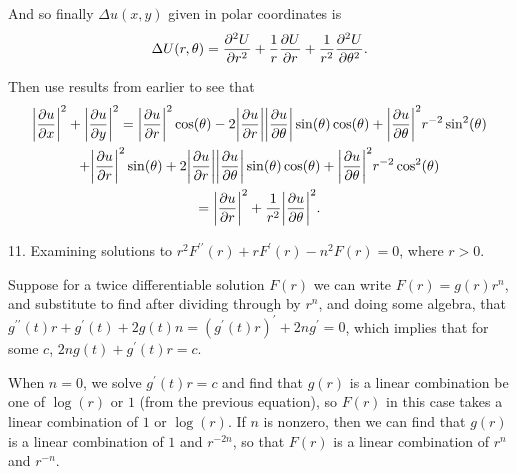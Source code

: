 \documentclass[11pt]{article}
\newcommand{\br}[1]{\left(#1\right)}
\begin{document}
And so finally $\Delta u(x,y)$ given in polar coordinates is \[\Delta U(r,\theta) = \pdv[2]{U}{r} + \frac{1}{r}\pdv{U}{r} + \frac{1}{r^2}\pdv[2]{U}{\theta}.\]

Then use results from earlier to see that \begin{multline*}\abs{\pdv{u}{x}}^2 + \abs{\pdv{u}{y}}^2 = \abs{\pdv{u}{r}}^2\cos(\theta) - 2\abs{\pdv{u}{r}}\abs{\pdv{u}{\theta}}\sin(\theta)\cos(\theta) +\abs{\pdv{u}{\theta}}^2r^{-2}\sin^2(\theta)\\ + \abs{\pdv{u}{r}}^2\sin(\theta) + 2\abs{\pdv{u}{r}}\abs{\pdv{u}{\theta}}\sin(\theta)\cos(\theta) +\abs{\pdv{u}{\theta}}^2r^{-2}\cos^2(\theta) \\ = \abs{\pdv{u}{r}}^2 + \frac{1}{r^2}\abs{\pdv{u}{\theta}}^2.\end{multline*}

11. Examining solutions to $r^2F^{\prime \prime}(r) + rF^{\prime}(r) - n^2F(r) = 0$, where $r>0$.

Suppose for a twice differentiable solution $F(r)$ we can write $F(r) = g(r)r^n$, and substitute to find after dividing through by $r^n$, and doing some algebra, that $g^{\prime \prime}(t)r + g^{\prime}(t) + 2g(t)n = \br{g^{\prime}(t)r}^{\prime} + 2ng^{\prime} = 0 $, which implies that for some $c$, $2ng(t) + g^{\prime}(t)r = c$.

When $n = 0$, we solve $g^{\prime}(t)r = c$ and find that $g(r)$ is a linear combination be one of $\log(r)$ or $1$ (from the previous equation), so $F(r)$ in this case takes a linear combination of $1$ or $\log(r)$. If $n$ is nonzero, then we can find that $g(r)$ is a linear combination of $1$ and $r^{-2n}$, so that $F(r)$ is a linear combination of $r^n$ and $r^{-n}$.
\end{document}
